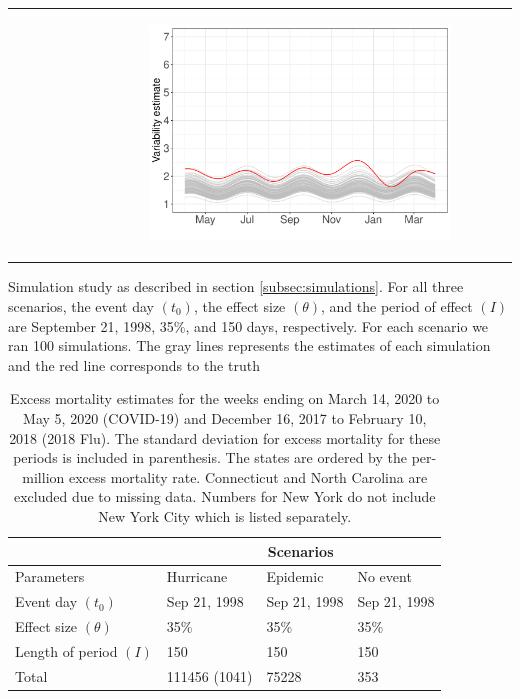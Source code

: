\documentclass[11pt]{article}
\begin{document}
\begin{suppfigure}[ht]
\begin{tabular}{lll}
\begin{subfigure}[t]{0.30\linewidth}
	\end{subfigure}&
	\begin{subfigure}[t]{0.30\linewidth}
		\centering
		\includegraphics[width=1\linewidth]{figs/supp-figure-10f.pdf}
	\end{subfigure}\\
    \end{tabular}
    \caption{Simulation study as described in section \ref{subsec:simulations}. For all three scenarios, the event day $(t_0)$, the effect size $(\theta)$, and the period of effect $(I)$ are September 21, 1998, 35\%, and 150 days, respectively. For each scenario we ran 100 simulations. The gray lines represents the estimates of each simulation and the red line corresponds to the truth }
    \label{supp-fig:simulations}
\end{suppfigure}

\newpage

\begin{table}
\centering
\begin{tabular}{|l|lll|}
  \hline
 & \multicolumn{3}{c|}{Scenarios} \\
\hline
Parameters & Hurricane & Epidemic & No event\\
\hline
Event day $(t_0)$ & Sep 21, 1998 & Sep 21, 1998 & Sep 21, 1998\\ 
Effect size $(\theta)$ & 35\% & 35\% & 35\% \\ 
Length of period $(I)$& 150 & 150 & 150     \\ 
 \hline
  Total & 111456 (1041) & 75228 & 353 \\ 
  \hline
 \end{tabular}
 \caption{Excess mortality estimates for the weeks ending on March 14, 2020 to May 5, 2020 (COVID-19) and  December 16, 2017 to February 10, 2018 (2018 Flu). The standard deviation for excess mortality for these periods is included in parenthesis. The states are ordered by the per-million excess mortality rate. Connecticut and North Carolina are excluded due to missing data. Numbers for New York do not include New York City which is listed separately.}
 \label{tab:covid19-states}
 \normalsize
\end{table}
\end{document}
